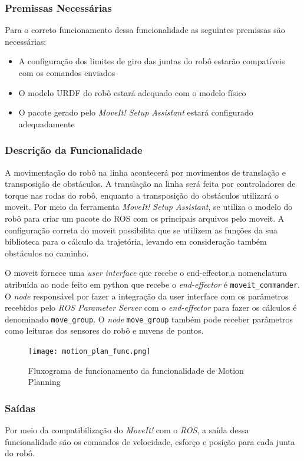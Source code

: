 \subsubsection{Premissas Necessárias}
Para o correto funcionamento dessa funcionalidade as seguintes premissas são necessárias:
\begin{itemize}
	\item A configuração dos limites de giro das juntas do robô estarão compatíveis com os comandos enviados
	\item O modelo URDF do robô estará adequado com o modelo físico
	\item O pacote gerado pelo \textit{MoveIt! Setup Assistant} estará configurado adequadamente
\end{itemize}
\subsubsection{Descrição da Funcionalidade}
A movimentação do robô na linha acontecerá por movimentos de translação e transposição de obstáculos. A translação na linha será feita por controladores de torque nas rodas do robô, enquanto a transposição do obstáculos utilizará o moveit.
Por meio da ferramenta \textit{MoveIt! Setup Assistant}, se utiliza o modelo do robô para criar um pacote do ROS com os principais arquivos pelo moveit. 
A configuração correta do moveit possibilita que se utilizem as funções da sua biblioteca para o cálculo da trajetória, levando em consideração também obstáculos no caminho.

O moveit fornece uma \textit{user interface} que recebe o end-effector,a nomenclatura atribuída ao node feito em python que recebe o \textit{end-effector} é \verb|moveit_commander|. O  \textit{node} responsável por fazer a integração da user interface com os parâmetros recebidos pelo \textit{ROS Parameter Server} com o \textit{end-effector} para fazer os cálculos é denominado \verb|move_group|. O \textit{node} \verb|move_group| também pode receber parâmetros como leituras dos sensores do robô e nuvens de pontos.

\begin{figure}[!h]
	\centering
	\texttt{[image: motion\_plan\_func.png]}
	\caption{Fluxograma de funcionamento da funcionalidade de Motion Planning}
	\label{fig:flux_motion}
\end{figure}

\subsubsection{Saídas}
Por meio da compatibilização do \textit{MoveIt!} com o \textit{ROS}, a saída dessa funcionalidade são os comandos de velocidade, esforço e posição para cada junta do robô.

